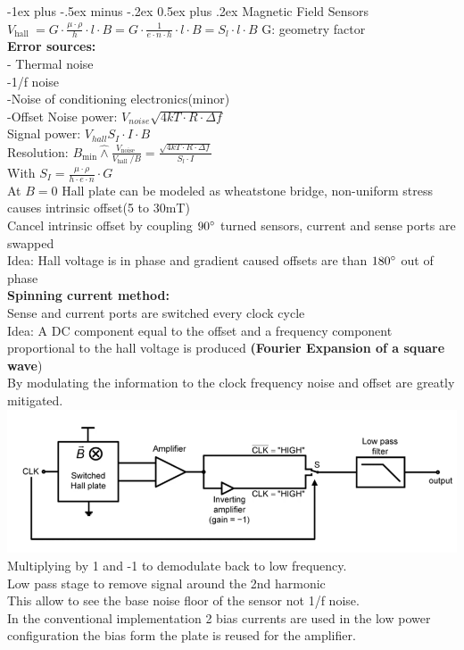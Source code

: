 \documentclass[5pt,landscape]{article}
\makeatletter
\renewcommand{\section}{\@startsection{section}{1}{0mm}%
                                {-1ex plus -.5ex minus -.2ex}%
                                {0.5ex plus .2ex}%
                                {\normalfont\large\bfseries}}
\makeatother
\begin{document}
\begin{multicols*}{5}
\section{Magnetic Field Sensors}
$ V_{\text {hall }}=G \cdot \frac{\mu \cdot \rho}{h} \cdot l \cdot B=G \cdot \frac{1}{e \cdot n \cdot h} \cdot l \cdot B=S_{l} \cdot l \cdot B $
G: geometry factor\\
\textbf{Error sources:}\\
- Thermal noise\\
-1/f noise \\
-Noise of conditioning electronics(minor)\\
-Offset
Noise power: $ V_{noise} \sqrt{4kT \cdot R \cdot \Delta f} $\\
Signal power: $ V_{hall} S_I \cdot I \cdot B $\\
Resolution: $ B_{\min } \hat{\wedge} \frac{V_{\text {noise }}}{V_{\text {hall }} / B}=\frac{\sqrt{4 k T \cdot R \cdot \Delta f}}{S_{l} \cdot I} $\\
With $ S_I = \frac{\mu \cdot \rho}{h\cdot e \cdot n} \cdot G $\\
At $ B=0 $ Hall plate can be modeled as wheatstone bridge, non-uniform stress causes intrinsic offset(5 to 30mT)\\
Cancel intrinsic offset by coupling $90 \degree  $ turned sensors, current and sense ports are swapped\\
Idea: Hall voltage is in phase and gradient caused offsets are than $ 180 \degree $ out of phase\\
\textbf{Spinning current method:}\\
Sense and current ports are switched every clock cycle\\
Idea: A DC component equal to the offset and a frequency component proportional to the hall voltage is produced \textbf{(Fourier Expansion of a square wave})\\
By modulating the information to the clock frequency noise and offset are greatly mitigated.\\
\includegraphics[width=\columnwidth]{images/switched_hall_system.png}
Multiplying by 1 and -1 to demodulate back to low frequency. \\
Low pass stage to remove signal around the 2nd harmonic\\
This allow to see the base noise floor of the sensor not 1/f noise.\\
In the conventional implementation 2 bias currents are used in the low power configuration the bias form the plate is reused for the amplifier.\\

\end{multicols*}
\end{document}

